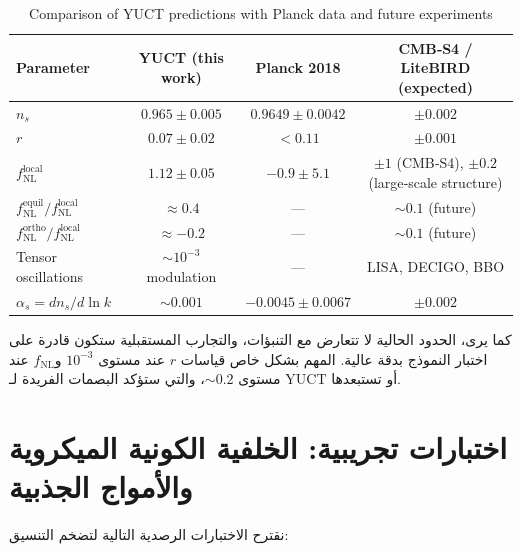 \documentclass[12pt,a4paper]{article}
\newcommand{\rs}{r}
\begin{document}
	\begin{otherlanguage}{english}
		\begin{table}[htbp]
			\centering
			\caption{Comparison of YUCT predictions with Planck data and future experiments}
			\label{tab:comparison}
			\begin{tabular}{lccc}
				\toprule
				\textbf{Parameter} & \textbf{YUCT (this work)} & \textbf{Planck 2018} & \textbf{CMB‑S4 / LiteBIRD (expected)} \\
				\midrule
				\(n_s\) & \(0.965 \pm 0.005\) & \(0.9649 \pm 0.0042\) & \(\pm 0.002\) \\
				\(\rs\) & \(0.07 \pm 0.02\) & \(<0.11\) & \(\pm 0.001\) \\
				\(f_{\mathrm{NL}}^{\mathrm{local}}\) & \(1.12 \pm 0.05\) & \(-0.9 \pm 5.1\) & \(\pm 1\) (CMB‑S4), \(\pm 0.2\) (large‑scale structure) \\
				\(f_{\mathrm{NL}}^{\mathrm{equil}} / f_{\mathrm{NL}}^{\mathrm{local}}\) & \(\approx 0.4\) & — & \(\sim 0.1\) (future) \\
				\(f_{\mathrm{NL}}^{\mathrm{ortho}} / f_{\mathrm{NL}}^{\mathrm{local}}\) & \(\approx -0.2\) & — & \(\sim 0.1\) (future) \\
				Tensor oscillations & \( \sim 10^{-3}\) modulation & — & LISA, DECIGO, BBO \\
				\(\alpha_s = dn_s/d\ln k\) & \(\sim 0.001\) & \(-0.0045 \pm 0.0067\) & \(\pm 0.002\) \\
				\bottomrule
			\end{tabular}
		\end{table}
	\end{otherlanguage}
	
	\noindent كما يرى، الحدود الحالية لا تتعارض مع التنبؤات، والتجارب المستقبلية ستكون قادرة على اختبار النموذج بدقة عالية. المهم بشكل خاص قياسات \(r\) عند مستوى \(10^{-3}\) و\(f_{\text{NL}}\) عند مستوى \(\sim 0.2\)، والتي ستؤكد البصمات الفريدة لـ YUCT أو تستبعدها.
	
	\section{اختبارات تجريبية: الخلفية الكونية الميكروية والأمواج الجذبية}
	\label{sec:tests}
	
	نقترح الاختبارات الرصدية التالية لتضخم التنسيق:
	
\end{document}
